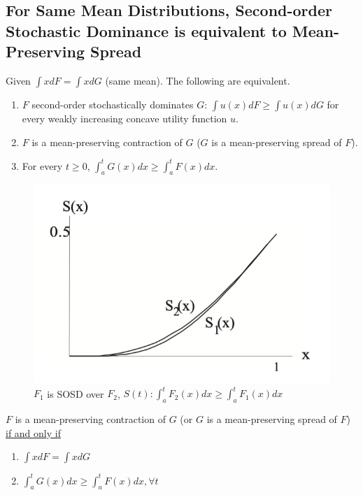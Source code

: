 \documentclass[11pt]{elegantbook}
\begin{document}
\subsection{For Same Mean Distributions, Second-order Stochastic Dominance is equivalent to Mean-Preserving Spread}
\begin{theorem}\label{SOSD_equiv}
    Given $\int x dF=\int x dG$ (same mean). The following are equivalent.
    \begin{enumerate}
        \item $F$ second-order stochastically dominates $G$: $\int u (x) dF \geq \int u(x) dG$  for every weakly increasing concave utility function $u$.
        \item $F$ is a mean-preserving contraction of $G$ ($G$ is a mean-preserving spread of $F$).
        \item For every $t\geq 0$, $\int_a^t G(x)dx\geq \int_a^t F(x)dx$.
    \end{enumerate}
\end{theorem}
\begin{center}\begin{figure}[htbp]
    \centering
    \includegraphics[scale=0.25]{SOSD_3.png}
    \caption{$F_1$ is SOSD over $F_2$, $S(t):\int_a^t F_2(x)dx\geq \int_a^t F_1(x)dx$}
    \label{}
\end{figure}\end{center}

\begin{corollary}
    \normalfont
    $F$ is a mean-preserving contraction of $G$ (or $G$ is a mean-preserving spread of $F$) \underline{if and only if}
    \begin{enumerate}[(1).]
        \item $\int x dF=\int x dG$
        \item $\int_a^t G(x)dx\geq \int_a^t F(x)dx, \forall t$
    \end{enumerate}
\end{corollary}
\end{document}
